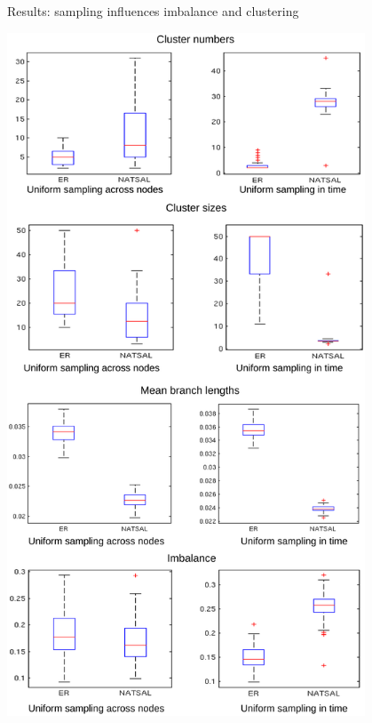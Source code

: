 \documentclass{beamer}
\begin{document}
\begin{frame}{Results: sampling influences imbalance and clustering}
\begin{center}
        \includegraphics[width=0.8\textwidth, trim=0 0 0 6.9cm, clip=true]{f11}
    \end{center}
\end{frame}
\end{document}
